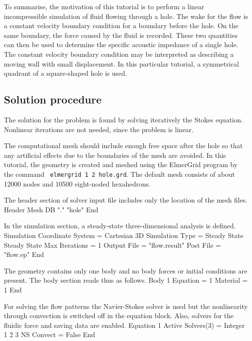 To summarise, the motivation of this tutorial is to perform a linear
incompressible simulation of fluid flowing through a hole. The wake
for the flow is a constant velocity boundary condition for a boundary
before the hole. On the same boundary, the force caused by the fluid
is recorded. These two quantities can then be used to determine the
specific acoustic impedance of a single hole. The constant velocity
boundary condition may be interpreted as describing a moving wall with
small displacement. In this particular tutorial, a symmetrical
quadrant of a square-shaped hole is used.



\subsection*{Solution procedure}

The solution for the problem is found by solving iteratively the
Stokes equation. Nonlinear iterations are not needed, since the
problem is linear.

The computational mesh should include enough free space after the hole
so that any artificial effects due to the boundaries of the mesh are
avoided. In this tutorial, the geometry is created and meshed using
the ElmerGrid program by the command
{\tt
elmergrid 1 2 hole.grd}. 
The default mesh consists of about 12000 nodes and 10500 eight-noded
hexahedrons.

The header section of solver input file includes only the location of
the mesh files.
\ttbegin
Header
  Mesh DB "." "hole"
End
\ttend

In the simulation section, a steady-state three-dimensional analysis
is defined.
\ttbegin
Simulation
  Coordinate System = Cartesian 3D
  Simulation Type = Steady State
  Steady State Max Iterations = 1
  Output File = "flow.result"
  Post File = "flow.ep"
End
\ttend

The geometry contains only one body and no body forces or initial
conditions are present. The body section reads thus as follows.
\ttbegin
Body 1
  Equation = 1
  Material = 1
End
\ttend

For solving the flow patterns the Navier-Stokes solver is used but the
nonlinearity through convection is switched off in the equation block.
Also, solvers for the fluidic force and saving data are enabled.
\ttbegin
Equation 1
  Active Solvers(3) = Integer 1 2 3
  NS Convect = False
End
\ttend

